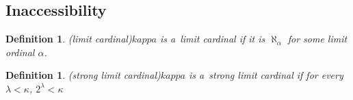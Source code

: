 \documentclass[12pt,a4paper]{article}
\newtheorem{definition}[theorem]{Definition}
\newcommand{\sub}{\subseteq}
\begin{document}
\begin{}












\subsection{Inaccessibility}\label{section:inaccessibility}
\begin{definition}(limit cardinal)\label{def:limit}
$kappa$ is a~\emph{limit cardinal} if it is $\aleph_\alpha$ for some limit ordinal $\alpha$.
\end{definition}

\begin{definition}(strong limit cardinal)\label{def:strong_limit}
$kappa$ is a~\emph{strong limit cardinal} if for every $\lambda < \kappa$, $2^\lambda < \kappa$
\end{definition}


\end{}
\end{document}
